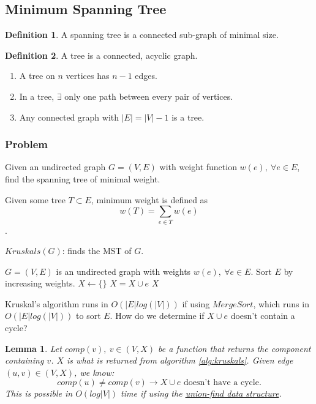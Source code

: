 \documentclass{article}
\newtheorem{lemma}[theorem]{Lemma}
\theoremstyle{definition}
\newtheorem{definition}{Definition}[section]
\begin{document}
\subsection{Minimum Spanning Tree}
\begin{definition}
A spanning tree is a connected sub-graph of minimal size.
\end{definition}
\begin{definition}
A tree is a connected, acyclic graph.

\begin{enumerate}
\item A tree on $n$ vertices has $n-1$ edges.
\item In a tree, $\exists$ only one path between every pair of vertices.
\item Any connected graph with $|E|=|V|-1$ is a tree.
\end{enumerate}
\end{definition}

\subsubsection{Problem}
Given an undirected graph $G = (V,E)$ with weight function $w(e),\: \forall e \in E$, find the spanning tree of minimal weight. 

Given some tree $T \subset E$, minimum weight is defined as $$w(T) = \sum_{e \in T}w(e)$$.

\begin{algorithm}
	\caption{$Kruskals(G)$: finds the MST of $G$.}
	\label{alg:kruskals}
	\begin{algorithmic}[1]
		\REQUIRE $G=(V,E)$ is an undirected graph with weights $w(e), \: \forall e \in E$.
		\STATE Sort $E$ by increasing weights. 
		\STATE $X \gets \{\}$
			\STATE $X = X \cup e$
		\ENDIF
		\ENDFOR
		\RETURN $X$
	\end{algorithmic}
\end{algorithm}

Kruskal's algorithm runs in $O(|E|log(|V|))$ if using $MergeSort$, which runs in $O(|E|log(|V|))$ to sort $E$. How do we determine if $X \cup e$ doesn't contain a cycle? 

\begin{lemma}
	Let $comp(v), \: v \in (V,X)$ be a function that returns the component containing $v$. $X$ is what is returned from algorithm \ref{alg:kruskals}. Given edge $(u,v) \in (V,X)$, we know:
	$$comp(u) \neq comp(v) \to X \cup e \text{ doesn't have a cycle.}$$
	This is possible in $O(log|V|)$ time if using the \href{https://en.wikipedia.org/wiki/Disjoint-set_data_structure}{union-find data structure}.
\end{lemma}
\end{document}
